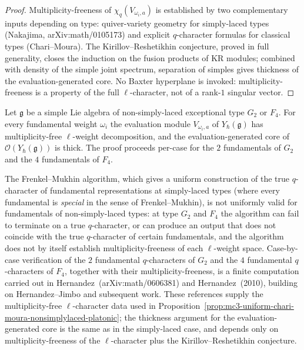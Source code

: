 \begin{proof}
Multiplicity-freeness of $\chi_q(V_{\omega_i,a})$ is established
by two complementary inputs depending on type: quiver-variety
geometry for simply-laced types (Nakajima, arXiv:math/0105173)
and explicit $q$-character formulas for classical types
(Chari--Moura).
The Kirillov--Reshetikhin conjecture, proved in full generality,
closes the induction on the fusion products of KR modules;
combined with density of the simple joint spectrum, separation of
simples gives thickness of the evaluation-generated core.
No Baxter hyperplane is invoked: multiplicity-freeness is a
property of the full $\ell$-character, not of a rank-$1$ singular
vector.
\end{proof}

\begin{proposition}
\label{prop:mc3-uniform-chari-moura-nonsimplylaced-platonic}
%
Let $\mathfrak{g}$ be a simple Lie algebra of non-simply-laced
exceptional type $G_2$ or $F_4$. For every fundamental weight
$\omega_i$ the evaluation module $V_{\omega_i,a}$ of
$Y_\hbar(\mathfrak{g})$ has multiplicity-free $\ell$-weight
decomposition, and the evaluation-generated core of
$\mathcal{O}(Y_\hbar(\mathfrak{g}))$ is thick. The proof proceeds
per-case for the $2$ fundamentals of $G_2$ and the $4$ fundamentals
of $F_4$.
\end{proposition}

\begin{remark}
\label{rem:fm-nonsimplylaced-failure}
The Frenkel--Mukhin algorithm, which gives a uniform construction
of the true $q$-character of fundamental representations at
simply-laced types (where every fundamental is \emph{special} in
the sense of Frenkel--Mukhin), is not uniformly valid for
fundamentals of non-simply-laced types: at type $G_2$ and $F_4$
the algorithm can fail to terminate on a true $q$-character, or
can produce an output that does not coincide with the true
$q$-character of certain fundamentals, and the algorithm does
not by itself establish multiplicity-freeness of each
$\ell$-weight space. Case-by-case verification of the $2$
fundamental $q$-characters of $G_2$ and the $4$ fundamental
$q$-characters of $F_4$, together with their multiplicity-freeness,
is a finite computation carried out in
Hernandez~(arXiv:math/0606381) and Hernandez~(2010), building on
Hernandez--Jimbo and subsequent work. These references supply the
multiplicity-free $\ell$-character data used in
Proposition~\ref{prop:mc3-uniform-chari-moura-nonsimplylaced-platonic};
the thickness argument for the evaluation-generated core is the
same as in the simply-laced case, and depends only on
multiplicity-freeness of the $\ell$-character plus the
Kirillov--Reshetikhin conjecture.
\end{remark}

